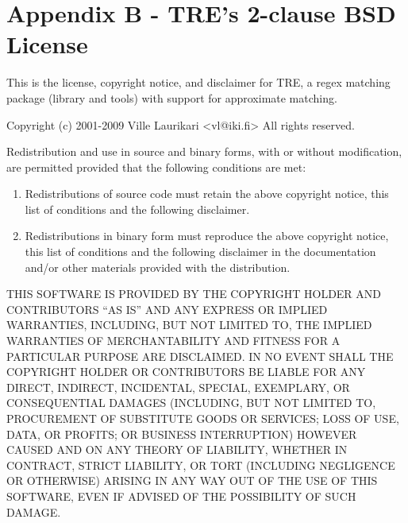 \chapter*{Appendix B - TRE's 2-clause BSD License}


\noindent This is the license, copyright notice, and disclaimer for TRE, a regex
matching package (library and tools) with support for approximate
matching.

\bigskip
\noindent Copyright (c) 2001-2009 Ville Laurikari <vl@iki.fi>
All rights reserved.

\bigskip
\noindent Redistribution and use in source and binary forms, with or without
modification, are permitted provided that the following conditions
are met:

\begin{enumerate}
  \item 
  Redistributions of source code must retain the above copyright
     notice, this list of conditions and the following disclaimer.

\item 
  Redistributions in binary form must reproduce the above copyright
     notice, this list of conditions and the following disclaimer in the
     documentation and/or other materials provided with the distribution.
\end{enumerate}

\bigskip
\noindent THIS SOFTWARE IS PROVIDED BY THE COPYRIGHT HOLDER AND CONTRIBUTORS
``AS IS'' AND ANY EXPRESS OR IMPLIED WARRANTIES, INCLUDING, BUT NOT
LIMITED TO, THE IMPLIED WARRANTIES OF MERCHANTABILITY AND FITNESS FOR
A PARTICULAR PURPOSE ARE DISCLAIMED.  IN NO EVENT SHALL THE COPYRIGHT
HOLDER OR CONTRIBUTORS BE LIABLE FOR ANY DIRECT, INDIRECT, INCIDENTAL,
SPECIAL, EXEMPLARY, OR CONSEQUENTIAL DAMAGES (INCLUDING, BUT NOT
LIMITED TO, PROCUREMENT OF SUBSTITUTE GOODS OR SERVICES; LOSS OF USE,
DATA, OR PROFITS; OR BUSINESS INTERRUPTION) HOWEVER CAUSED AND ON ANY
THEORY OF LIABILITY, WHETHER IN CONTRACT, STRICT LIABILITY, OR TORT
(INCLUDING NEGLIGENCE OR OTHERWISE) ARISING IN ANY WAY OUT OF THE USE
OF THIS SOFTWARE, EVEN IF ADVISED OF THE POSSIBILITY OF SUCH DAMAGE.


